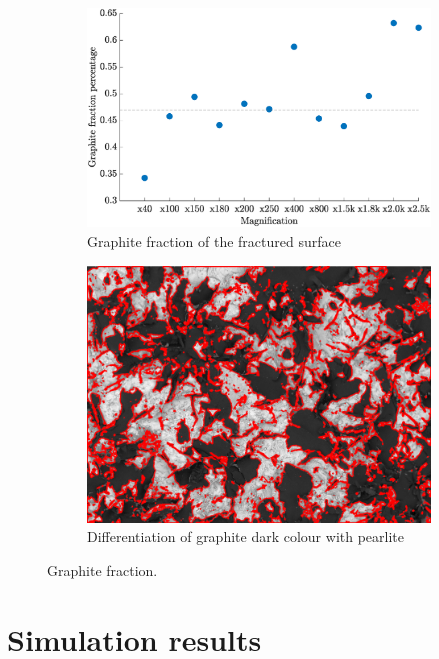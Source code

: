 \documentclass[11pt,a4paper]{article}
\begin{document}
\begin{figure} [ht]
\begin{subfigure}{0.52\textwidth}
\includegraphics[scale=0.38, center]{graphite_fraction.eps}
\caption{Graphite fraction of the fractured surface}
\end{subfigure}
\begin{subfigure}{0.6\textwidth}
\vspace{6mm}
\includegraphics[scale=0.45, center]{SEM_analysis.png}
\vspace{0mm}
\caption{Differentiation of graphite dark colour with pearlite}
\end{subfigure}
\caption{Graphite fraction.}
\label{graphite fraction}
\end{figure}


\section{Simulation results}
\end{document}
